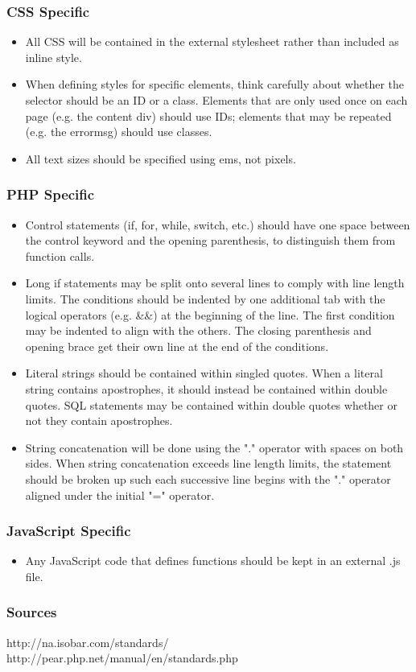		\subsubsection{CSS Specific}
		\begin{itemize}
			\item All CSS will be contained in the external stylesheet rather than included as inline style.
			\item When defining styles for specific elements, think carefully about whether the selector should be an ID or a class. Elements that are only used once on each page (e.g. the content div) should use IDs; elements that may be repeated (e.g. the errormsg) should use classes.
			\item All text sizes should be specified using ems, not pixels.
		\end{itemize}
			
		\subsubsection{PHP Specific}
		\begin{itemize}
			\item Control statements (if, for, while, switch, etc.) should have one space between the control keyword and the opening parenthesis, to distinguish them from function calls.
			\item Long if statements may be split onto several lines to comply with line length limits. The conditions should be indented by one additional tab with the logical operators (e.g. \&\&) at the beginning of the line. The first condition may be indented to align with the others. The closing parenthesis and opening brace get their own line at the end of the conditions.
			\item Literal strings should be contained within singled quotes. When a literal string contains apostrophes, it should instead be contained within double quotes. SQL statements may be contained within double quotes whether or not they contain apostrophes.
			\item String concatenation will be done using the "." operator with spaces on both sides. When string concatenation exceeds line length limits, the statement should be broken up such each successive line begins with the "." operator aligned under the initial "=" operator.
		\end{itemize}
			
		\subsubsection{JavaScript Specific}
		\begin{itemize}
			\item Any JavaScript code that defines functions should be kept in an external .js file.
		\end{itemize}
			
		\subsubsection{Sources}
			\indent http://na.isobar.com/standards/ \\
			\indent http://pear.php.net/manual/en/standards.php
